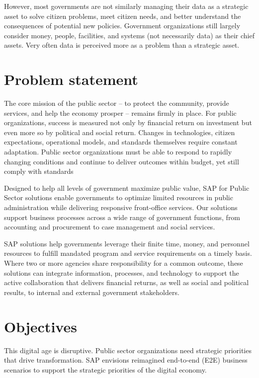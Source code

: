 However, most governments are not similarly managing
their data as a strategic asset to solve citizen problems,
meet citizen needs, and better understand the
consequences of potential new policies. Government
organizations still largely consider money, people,
facilities, and systems (not necessarily data) as their chief
assets. Very often data is perceived more as a problem
than a strategic asset.


\section[Problem statement]{\textbf{Problem statement}}

The core mission of the public sector – to protect the community, provide services,
and help the economy prosper – remains firmly in place. For public organizations,
success is measured not only by financial return on investment but even more so by
political and social return. Changes in technologies, citizen expectations, operational
models, and standards themselves require constant adaptation. Public sector
organizations must be able to respond to rapidly changing conditions and continue to
deliver outcomes within budget, yet still comply with standards

Designed to help all levels of government maximize public value, SAP for Public Sector solutions enable governments to optimize limited resources in public administration while delivering responsive front-office services. Our solutions support business processes across a wide range of government functions, from accounting and procurement to case management and social services.

SAP solutions help governments leverage their finite time, money, and personnel resources to fulfill mandated program and service requirements on a timely basis. Where two or more agencies share responsibility for a common outcome, these solutions can integrate information, processes, and technology to support the active collaboration that delivers financial returns, as well as social and political results, to internal and external government stakeholders. 

\section[Objectives]{\textbf{Objectives}}
This digital age is disruptive. Public sector organizations need strategic priorities that drive transformation. SAP envisions reimagined end-to-end (E2E)
business scenarios to support the strategic priorities of the digital economy.

